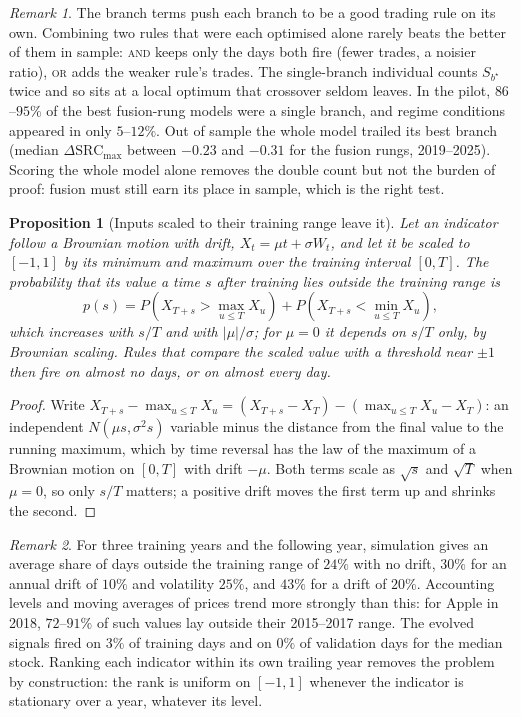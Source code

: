 \documentclass[11pt,a4paper]{article}
\newtheorem{proposition}{Proposition}
\theoremstyle{remark}
\newtheorem*{remark}{Remark}
\begin{document}
\begin{remark}
The branch terms push each branch to be a good trading rule on its own. Combining two rules that were each optimised alone rarely beats the better of them in sample: \textsc{and} keeps only the days both fire (fewer trades, a noisier ratio), \textsc{or} adds the weaker rule's trades. The single-branch individual counts $S_{b^\star}$ twice and so sits at a local optimum that crossover seldom leaves. In the pilot, $86$--$95\%$ of the best fusion-rung models were a single branch, and regime conditions appeared in only $5$--$12\%$. Out of sample the whole model trailed its best branch (median $\Delta\mathrm{SRC}_{\max}$ between $-0.23$ and $-0.31$ for the fusion rungs, 2019--2025). Scoring the whole model alone removes the double count but not the burden of proof: fusion must still earn its place in sample, which is the right test.
\end{remark}

\begin{proposition}[Inputs scaled to their training range leave it]\label{prop:range}
Let an indicator follow a Brownian motion with drift, $X_t = \mu t + \sigma W_t$, and let it be scaled to $[-1,1]$ by its minimum and maximum over the training interval $[0,T]$. The probability that its value a time $s$ after training lies outside the training range is
\begin{equation}
p(s) = P\!\left(X_{T+s} > \max_{u\le T}X_u\right) + P\!\left(X_{T+s} < \min_{u\le T}X_u\right),
\end{equation}
which increases with $s/T$ and with $|\mu|/\sigma$; for $\mu=0$ it depends on $s/T$ only, by Brownian scaling. Rules that compare the scaled value with a threshold near $\pm1$ then fire on almost no days, or on almost every day.
\end{proposition}
\begin{proof}
Write $X_{T+s} - \max_{u\le T}X_u = (X_{T+s}-X_T) - (\max_{u\le T}X_u - X_T)$: an independent $N(\mu s,\sigma^2 s)$ variable minus the distance from the final value to the running maximum, which by time reversal has the law of the maximum of a Brownian motion on $[0,T]$ with drift $-\mu$. Both terms scale as $\sqrt{s}$ and $\sqrt{T}$ when $\mu=0$, so only $s/T$ matters; a positive drift moves the first term up and shrinks the second.
\end{proof}

\begin{remark}
For three training years and the following year, simulation gives an average share of days outside the training range of $24\%$ with no drift, $30\%$ for an annual drift of $10\%$ and volatility $25\%$, and $43\%$ for a drift of $20\%$. Accounting levels and moving averages of prices trend more strongly than this: for Apple in 2018, $72$--$91\%$ of such values lay outside their 2015--2017 range. The evolved signals fired on $3\%$ of training days and on $0\%$ of validation days for the median stock. Ranking each indicator within its own trailing year removes the problem by construction: the rank is uniform on $[-1,1]$ whenever the indicator is stationary over a year, whatever its level.
\end{remark}
\end{document}
